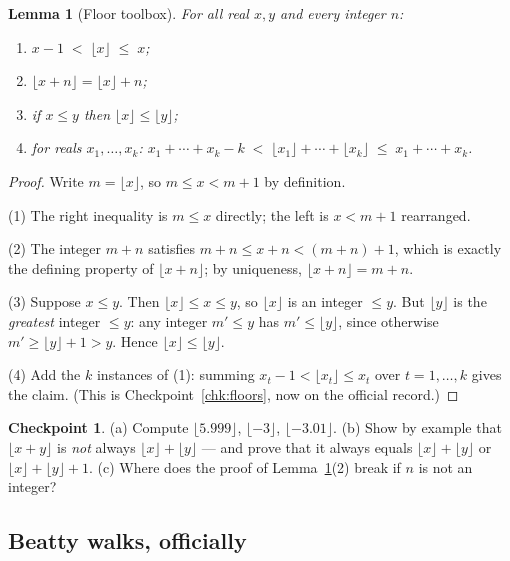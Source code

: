 \documentclass[11pt,reqno]{amsart}
\theoremstyle{plain}
\newtheorem{lemma}[theorem]{Lemma}
\theoremstyle{definition}
\newtheorem{checkpoint}[theorem]{Checkpoint}   %
\theoremstyle{remark}
\begin{document}
\begin{lemma}[Floor toolbox]\label{lem:floor-toolbox}
For all real $x, y$ and every integer $n$:
\begin{enumerate}
\item $x - 1 \;<\; \lfloor x \rfloor \;\le\; x$;
\item $\lfloor x + n \rfloor = \lfloor x \rfloor + n$;
\item if $x \le y$ then $\lfloor x \rfloor \le \lfloor y \rfloor$;
\item for reals $x_1, \dots, x_k$:\quad
      $x_1 + \cdots + x_k - k \;<\; \lfloor x_1 \rfloor + \cdots + \lfloor x_k \rfloor
       \;\le\; x_1 + \cdots + x_k$.
\end{enumerate}
\end{lemma}

\begin{proof}
Write $m = \lfloor x \rfloor$, so $m \le x < m+1$ by definition.

(1) The right inequality is $m \le x$ directly; the left is $x < m + 1$ rearranged.

(2) The integer $m + n$ satisfies $m + n \le x + n < (m+n) + 1$, which is exactly the
defining property of $\lfloor x + n \rfloor$; by uniqueness,
$\lfloor x+n \rfloor = m + n$.

(3) Suppose $x \le y$. Then $\lfloor x \rfloor \le x \le y$, so $\lfloor x \rfloor$
is an integer $\le y$. But $\lfloor y \rfloor$ is the \emph{greatest} integer $\le y$:
any integer $m' \le y$ has $m' \le \lfloor y \rfloor$, since otherwise
$m' \ge \lfloor y \rfloor + 1 > y$. Hence $\lfloor x \rfloor \le \lfloor y \rfloor$.

(4) Add the $k$ instances of (1): summing $x_t - 1 < \lfloor x_t \rfloor \le x_t$ over
$t = 1, \dots, k$ gives the claim. (This is Checkpoint~\ref{chk:floors}, now on the
official record.)
\end{proof}

\begin{checkpoint}
(a) Compute $\lfloor 5.999 \rfloor$, $\lfloor -3 \rfloor$, $\lfloor -3.01 \rfloor$.
(b) Show by example that $\lfloor x + y \rfloor$ is \emph{not} always
$\lfloor x \rfloor + \lfloor y \rfloor$ --- and prove that it always equals
$\lfloor x \rfloor + \lfloor y \rfloor$ or $\lfloor x \rfloor + \lfloor y \rfloor + 1$.
(c) Where does the proof of Lemma~\ref{lem:floor-toolbox}(2) break if $n$ is not an
integer?
\end{checkpoint}

\subsection{Beatty walks, officially}
\end{document}
